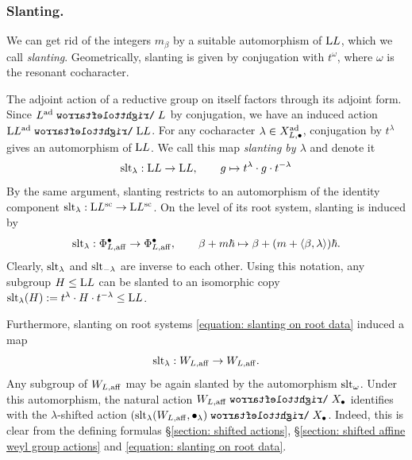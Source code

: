 \subsubsection{Slanting.}\label{section: slanting}
We can get rid of the integers $m_{\beta}$ by a suitable automorphism of $\mathrm{L} L$, which we call \emph{slanting}. Geometrically, slanting is given by conjugation with $t^{\omega}$, where $\omega$ is the resonant cocharacter. 

\begin{discussion}\label{discussion: slanting}
The adjoint action of a reductive group on itself factors through its adjoint form. Since $L^{\ad} \acts L$ by conjugation, we have an induced action $\lo L^{\ad} \acts \lo L$. For any cocharacter $\lambda \in X^{{\operatorname{ad}}}_{L, \bullet}$, conjugation by $t^{\lambda}$ gives an automorphism of $\mathrm{L} L$. We call this map \emph{slanting by $\lambda$} and denote it
\begin{equation}
    \operatorname{slt}_{\lambda}: \mathrm{L} L \to \mathrm{L} L, \qquad g \mapsto t^{\lambda}\cdot g \cdot t^{-\lambda}
\end{equation}
By the same argument, slanting restricts to an automorphism of the identity component $\operatorname{slt}_{\lambda}: \mathrm{L} L^{\mathrm{sc}} \to \mathrm{L} L^{\mathrm{sc}}$. On the level of its root system, slanting is induced by
\begin{equation}\label{equation: slanting on root data}
    \operatorname{slt}_{\lambda}: \Phi^{\bullet}_{L, \mathrm{aff}} \to \Phi^{\bullet}_{L, \mathrm{aff}}, 
    \qquad
    \beta + m\hbar \mapsto \beta + (m + \langle \beta, \lambda \rangle)\hbar.
\end{equation}
Clearly, $\operatorname{slt}_{\lambda}$ and $\operatorname{slt}_{-\lambda}$ are inverse to each other.
%
Using this notation, any subgroup $H \leq \mathrm{L} L$ can be slanted to an isomorphic copy $\operatorname{slt}_{\lambda}(H) := t^{\lambda} \cdot H \cdot t^{-\lambda} \leq \mathrm{L} L$.

Furthermore, slanting on root systems \eqref{equation: slanting on root data} induced a map
\begin{equation}\label{equation: slanting on affine weyl groups}
    \operatorname{slt}_{\lambda}: W_{L, \mathrm{aff}} \to W_{L, \mathrm{aff}}.
\end{equation}
Any subgroup of $W_{L, \mathrm{aff}}$ may be again slanted by the automorphism $\operatorname{slt}_{\omega}$. Under this automorphism, the natural action $W_{L, \aff} \acts X_{\bullet}$ identifies with the $\lambda$-shifted action $(\slant_{\lambda}(W_{L, \aff}, \bullet_{\lambda}) \acts X_{\bullet}$.
Indeed, this is clear from the defining formulas \S \ref{section: shifted actions}, \S \ref{section: shifted affine weyl group actions} and \eqref{equation: slanting on root data}.
\end{discussion}

